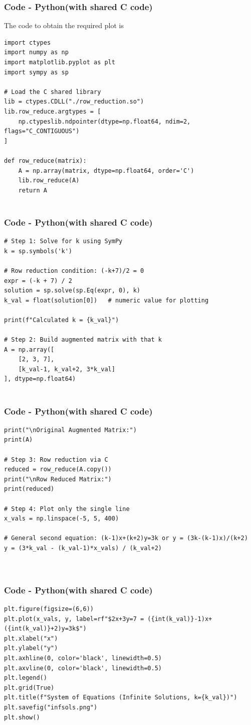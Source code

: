 \documentclass{beamer}
\theoremstyle{remark}
\numberwithin{equation}{section}
\begin{document}
\begin{frame}[fragile]
    \frametitle{Code - Python(with shared C code)}
    The code to obtain the required plot is
    \begin{lstlisting}
import ctypes
import numpy as np
import matplotlib.pyplot as plt
import sympy as sp

# Load the C shared library
lib = ctypes.CDLL("./row_reduction.so")
lib.row_reduce.argtypes = [
    np.ctypeslib.ndpointer(dtype=np.float64, ndim=2, flags="C_CONTIGUOUS")
]

def row_reduce(matrix):
    A = np.array(matrix, dtype=np.float64, order='C')
    lib.row_reduce(A)
    return A


\end{lstlisting}
\end{frame}
\begin{frame}[fragile]
\frametitle{Code - Python(with shared C code)}
\begin{lstlisting}
# Step 1: Solve for k using SymPy
k = sp.symbols('k')

# Row reduction condition: (-k+7)/2 = 0
expr = (-k + 7) / 2
solution = sp.solve(sp.Eq(expr, 0), k)
k_val = float(solution[0])   # numeric value for plotting

print(f"Calculated k = {k_val}")

# Step 2: Build augmented matrix with that k
A = np.array([
    [2, 3, 7],
    [k_val-1, k_val+2, 3*k_val]
], dtype=np.float64)


\end{lstlisting}
\end{frame}

\begin{frame}[fragile]
\frametitle{Code - Python(with shared C code)}
\begin{lstlisting}
print("\nOriginal Augmented Matrix:")
print(A)

# Step 3: Row reduction via C
reduced = row_reduce(A.copy())
print("\nRow Reduced Matrix:")
print(reduced)

# Step 4: Plot only the single line
x_vals = np.linspace(-5, 5, 400)

# General second equation: (k-1)x+(k+2)y=3k or y = (3k-(k-1)x)/(k+2)
y = (3*k_val - (k_val-1)*x_vals) / (k_val+2)



\end{lstlisting}
\end{frame}

\begin{frame}[fragile]
\frametitle{Code - Python(with shared C code)}
\begin{lstlisting}
plt.figure(figsize=(6,6))
plt.plot(x_vals, y, label=rf"$2x+3y=7 = ({int(k_val)}-1)x+({int(k_val)}+2)y=3k$")
plt.xlabel("x")
plt.ylabel("y")
plt.axhline(0, color='black', linewidth=0.5)
plt.axvline(0, color='black', linewidth=0.5)
plt.legend()
plt.grid(True)
plt.title(f"System of Equations (Infinite Solutions, k={k_val})")
plt.savefig("infsols.png")
plt.show()


\end{lstlisting}
\end{frame}
\end{document}
